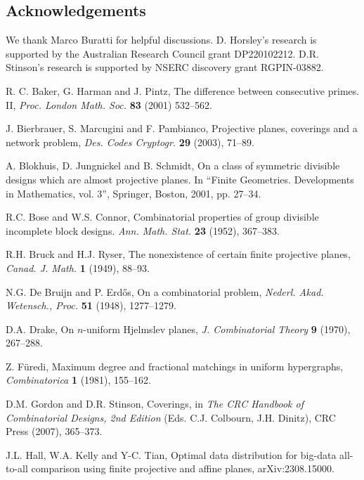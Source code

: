 \documentclass[11pt]{article}
\theoremstyle{definition}
\begin{document}
\subsection*{Acknowledgements}

We thank Marco Buratti for helpful discussions. D. Horsley's research is supported by the Australian Research Council grant DP220102212. D.R. Stinson's research is supported by NSERC discovery grant RGPIN-03882.

\begin{thebibliography}{10}

 R. C. Baker, G. Harman and J. Pintz, The difference between consecutive primes. II,
\textit{Proc. London Math. Soc.}
\textbf{83} (2001) 532--562.

J. Bierbrauer, S. Marcugini and F. Pambianco,
Projective planes, coverings and a network problem,
\textit{Des. Codes Cryptogr.} \textbf{29} (2003), 71--89.

A. Blokhuis, D. Jungnickel and B. Schmidt,
On a class of symmetric divisible designs which are almost projective planes.
 In ``Finite Geometries. Developments in Mathematics, vol. 3'', Springer, Boston, 2001, pp. 27--34.

R.C. Bose and W.S. Connor,
Combinatorial properties of group divisible incomplete block designs.
\emph{Ann. Math. Stat.} {\bf 23} (1952), 367--383.

R.H. Bruck and H.J. Ryser, The nonexistence of certain finite projective planes,
\textit{Canad. J. Math. } \textbf{1} (1949), 88--93.

N.G. De Bruijn and P. Erd\H{o}s, On a combinatorial problem,
\textit{Nederl. Akad. Wetensch., Proc.} \textbf{51} (1948), 1277--1279.

D.A. Drake, On $n$-uniform Hjelmslev planes,
\textit{J. Combinatorial Theory} \textbf{9} (1970), 267--288.


Z. F{\"u}redi,  Maximum degree and fractional matchings in uniform hypergraphs,
\textit{Combinatorica}
\textbf{1} (1981), 155--162.

D.M. Gordon and D.R. Stinson, Coverings,
in \emph{The CRC Handbook of Combinatorial Designs, 2nd Edition} (Eds. C.J. Colbourn, J.H. Dinitz),
CRC Press (2007), 365--373.

J.L. Hall, W.A. Kelly and Y-C. Tian,  Optimal data distribution for big-data all-to-all comparison using finite projective and affine planes, arXiv:2308.15000.


\end{thebibliography}
\end{document}
